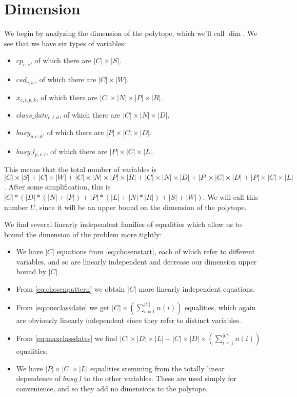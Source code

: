 \section{Dimension}

We begin by analyzing the dimension of the polytope, which we'll call $\dim$. We see that we have six types of variables:
\begin{itemize}
\item $cp_{c, s}$, of which there are $|C| \times |S|$.
\item $csd_{c, w}$, of which there are $|C| \times |W|$.
\item $x_{c, l, p, k}$, of which there are $|C| \times |N| \times |P| \times |R|$.
\item $class\_date_{c, l, d}$, of which there are $|C| \times |N| \times |D|$.
\item $busy_{p, c, d}$, of which there are $|P| \times |C| \times |D|$.
\item $busy\_l_{p, c, l}$, of which there are $|P| \times |C| \times |L|$.
\end{itemize}

This means that the total number of variables is $|C| \times |S| + |C| \times |W| + |C| \times |N| \times |P| \times |R| + |C| \times |N| \times |D| + |P| \times |C| \times |D| + |P| \times |C| \times |L|$. After some simplification, this is $|C| * (|D| * (|N| + |P|) + |P| * (|L| + |N| * |R|) + |S| + |W|)$. We will call this number $U$, since it will be an upper bound on the dimension of the polytope.


We find several linearly independent families of equalities which allow us to bound the dimension of the problem more tightly:
\begin{itemize}
\item We have $|C|$ equations from \ref{eq:chosenstart}, each of which refer to different variables, and so are linearly independent and decrease our dimension upper bound by $|C|$.
\item From \ref{eq:chosenpattern} we obtain $|C|$ more linearly independent equations.
\item From \ref{eq:oneclassdate} we get $|C| \times (\sum_{i = 1}^{|C|} n(i))$ equalities, which again are obviously linearly independent since they refer to distinct variables.
\item From \ref{eq:maxclassdates} we find $|C| \times |D| \times |L| - |C| \times |D| \times (\sum_{i = 1}^{|C|} n(i))$ equalities.
\item We have $|P| \times |C| \times |L|$ equalities stemming from the totally linear dependence of $busy\_l$ to the other variables. These are used simply for convenience, and so they add no dimensions to the polytope.
\end{itemize}

